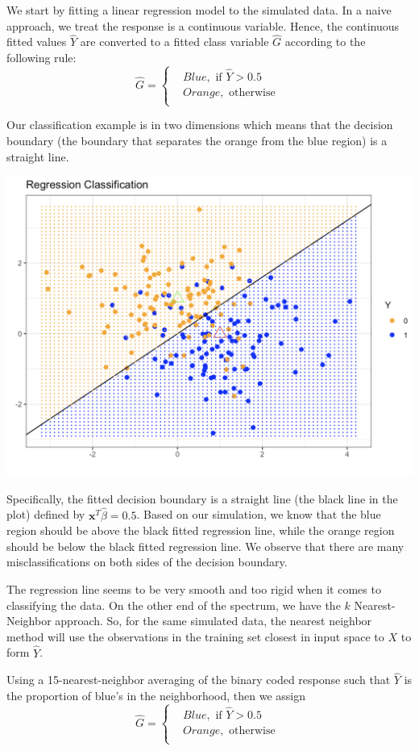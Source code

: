 \documentclass[
]{book}
\begin{document}
We start by fitting a linear regression model to the simulated data. In a naive approach, we treat the response is a continuous variable. Hence, the continuous fitted values \(\hat{Y}\) are converted to a fitted class variable \(\hat{G}\) according to the following rule:
\[\hat{G} = \begin{cases}
& Blue, \text{ if } \hat{Y} > 0.5\\
& Orange, \text{ otherwise } \\
\end{cases} \]

Our classification example is in two dimensions which means that the decision boundary (the boundary that separates the orange from the blue region) is a straight line.

\begin{center}\includegraphics[width=0.7\linewidth]{images/week1/regclass} \end{center}

Specifically, the fitted decision boundary is a straight line (the black line in the plot) defined by \(\mathbf{x}^T \hat{\beta} = 0.5\). Based on our simulation, we know that the blue region should be above the black fitted regression line, while the orange region should be below the black fitted regression line. We observe that there are many misclassifications on both sides of the decision boundary.

The regression line seems to be very smooth and too rigid when it comes to classifying the data. On the other end of the spectrum, we have the \(k\) Nearest-Neighbor approach. So, for the same simulated data, the nearest neighbor method will use the observations in the training set closest in input space to \(X\) to form \(\hat{Y}\).

Using a 15-nearest-neighbor averaging of the binary coded response such that \(\hat{Y}\) is the proportion of blue's in the neighborhood, then we assign
\[\hat{G} = \begin{cases}
& Blue, \text{ if } \hat{Y} > 0.5\\
& Orange,\text{ otherwise } \\
\end{cases} \]
\end{document}
